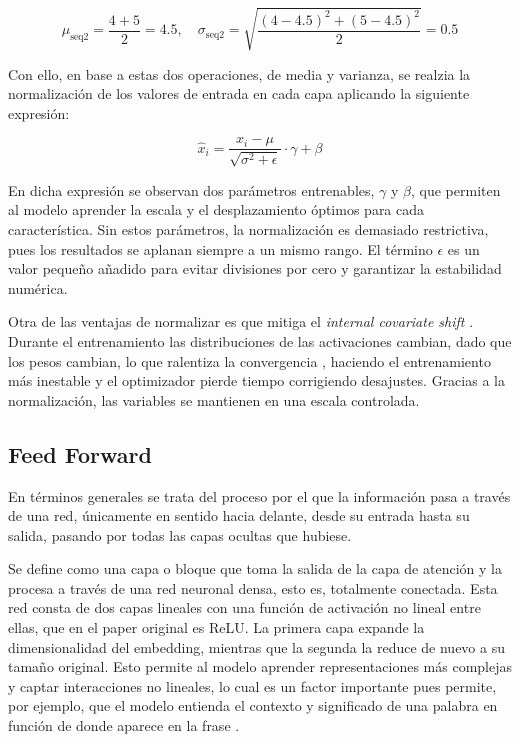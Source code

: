 \documentclass[11pt]{book}
\begin{document}
\[
\mu_{\text{seq2}} = \frac{4 + 5}{2} = 4.5, 
\quad 
\sigma_{\text{seq2}} = \sqrt{\frac{(4-4.5)^2 + (5-4.5)^2}{2}} = 0.5
\]

Con ello, en base a estas dos operaciones, de media y varianza, se realzia la normalización de los valores de entrada en cada capa aplicando la siguiente expresión: 

\begin{equation}
    \hat{x}_i = \frac{x_i - \mu}{\sqrt{\sigma^2 + \epsilon}} \cdot \gamma + \beta
    \label{eq:normalization_sigma}
\end{equation}

En dicha expresión se observan dos parámetros entrenables, $\gamma$ y $\beta$, que permiten al modelo aprender la escala y el desplazamiento óptimos para cada característica. Sin estos parámetros, la normalización es demasiado restrictiva, pues los resultados se aplanan siempre a un mismo rango. El término $\epsilon$ es un valor pequeño añadido para evitar divisiones por cero y garantizar la estabilidad numérica.

Otra de las ventajas de normalizar es que mitiga el \textit{internal covariate shift} \parencite{sharma2024addnorm}. Durante el entrenamiento las distribuciones de las activaciones cambian, dado que los pesos cambian, lo que ralentiza la convergencia \parencite{apxml_addnorm}, haciendo el entrenamiento más inestable y el optimizador pierde tiempo corrigiendo desajustes. Gracias a la normalización, las variables se mantienen en una escala controlada.


\subsection{Feed Forward} \label{subsec:feedforward}
En términos generales se trata del proceso por el que la información pasa a través de una red, únicamente en sentido hacia delante, desde su entrada hasta su salida, pasando por todas las capas ocultas que hubiese. 

Se define como una capa o bloque que toma la salida de la capa de atención y la procesa a través de una red neuronal densa, esto es, totalmente conectada. Esta red consta de dos capas lineales con una función de activación no lineal entre ellas, que en el paper original es ReLU. La primera capa expande la dimensionalidad del embedding, mientras que la segunda la reduce de nuevo a su tamaño original. Esto permite al modelo aprender representaciones más complejas y captar interacciones no lineales, lo cual es un factor importante pues permite, por ejemplo, que el modelo entienda el contexto y significado de una palabra en función de donde aparece en la frase \parencite{kyeg_feedforward_demystified}.
\end{document}
